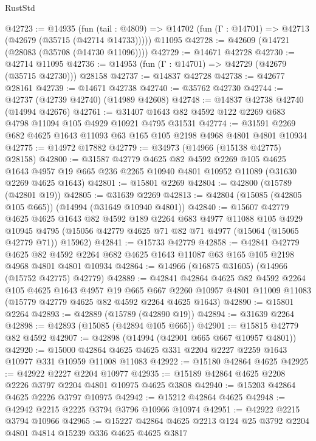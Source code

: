 \begin{lexlean}{RustStd}
\begin{coremodule}
@42723 := @14935
    (fun (tail : @4809) => @14702 (fun (Γ : @14701) => @42713 (@42679 (@35715 (@42714 @14733)))))
    @11095
@42728 := @42609 (@14721 (@28083 (@35708 (@14730 @11096))))
@42729 := @14671 @42728
@42730 := @42714 @11095
@42736 := @14953 (fun (Γ : @14701) => @42729 (@42679 (@35715 @42730))) @28158
@42737 := @14837 @42728
@42738 := @42677 @28161
@42739 := @14671 @42738
@42740 := @35762 @42730
@42744 := @42737 (@42739 @42740) (@14989 @42608)
@42748 := @14837 @42738 @42740 (@14994 @42676)
@42761 := @31407 @1643 @82 @4592 @122 @2269 @683 @4798 @11094 @105 @4929 @10921 @4795 @31531
@42774 := @31591 @2269 @682 @4625 @1643 @11093 @63 @165 @105 @2198 @4968 @4801 @4801 @10934
@42775 := @14972 @17882
@42779 := @34973 (@14966 (@15138 @42775) @28158)
@42800 := @31587
    @42779
    @4625
    @82
    @4592
    @2269
    @105
    @4625
    @1643
    @4957
    @19
    @665
    @236
    @2265
    @10940
    @4801
    @10952
    @11089
    (@31630 @2269 @4625 @1643)
@42801 := @15801 @2269
@42804 := @42800 (@15789 (@42801 @19))
@42805 := @31639 @2269
@42813 := @42804 (@15085 (@42805 @105 @665)) (@14994 (@31649 @10940 @4801))
@42840 := @15607
    @42779
    @4625
    @4625
    @1643
    @82
    @4592
    @189
    @2264
    @683
    @4977
    @11088
    @105
    @4929
    @10945
    @4795
    (@15056 @42779 @4625 @71 @82 @71 @4977 (@15064 (@15065 @42779 @71)) @15962)
@42841 := @15733 @42779
@42858 := @42841
    @42779
    @4625
    @82
    @4592
    @2264
    @682
    @4625
    @1643
    @11087
    @63
    @165
    @105
    @2198
    @4968
    @4801
    @4801
    @10934
@42864 := @14966 (@16875 @31605) (@14966 (@15752 @42775) @42779)
@42889 := @42841
    @42864
    @4625
    @82
    @4592
    @2264
    @105
    @4625
    @1643
    @4957
    @19
    @665
    @667
    @2260
    @10957
    @4801
    @11009
    @11083
    (@15779 @42779 @4625 @82 @4592 @2264 @4625 @1643)
@42890 := @15801 @2264
@42893 := @42889 (@15789 (@42890 @19))
@42894 := @31639 @2264
@42898 := @42893 (@15085 (@42894 @105 @665))
@42901 := @15815 @42779 @82 @4592
@42907 := @42898 (@14994 (@42901 @665 @667 @10957 @4801))
@42920 := @15000 @42864 @4625 @4625 @331 @2204 @2227 @2259 @1643 @10977 @331 @10959 @11008 @11083
@42922 := @15180 @42864 @4625
@42925 := @42922 @2227 @2204 @10977
@42935 := @15189 @42864 @4625 @2208 @2226 @3797 @2204 @4801 @10975 @4625 @3808
@42940 := @15203 @42864 @4625 @2226 @3797 @10975
@42942 := @15212 @42864 @4625
@42948 := @42942 @2215 @2225 @3794 @3796 @10966 @10974
@42951 := @42922 @2215 @3794 @10966
@42965 := @15227 @42864 @4625 @2213 @124 @25 @3792 @2204 @4801 @4814 @15239 @336 @4625 @4625 @3817

\end{coremodule}
\end{lexlean}
